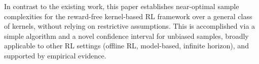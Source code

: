 In contrast to the existing work, this paper establishes near-optimal sample complexities for the reward-free kernel-based RL framework over a general class of kernels, without relying on restrictive assumptions. This is accomplished via a simple algorithm and a novel confidence interval for unbiased samples, broadly applicable to other RL settings (offline RL, model-based, infinite horizon), and supported by empirical evidence.
